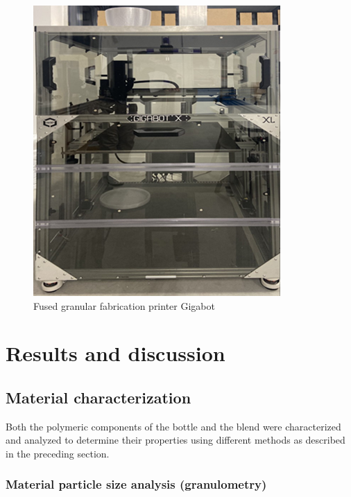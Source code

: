 \documentclass[
  letterpaper,
  DIV=11,
  numbers=noendperiod]{scrartcl}
\begin{document}
\begin{figure}

{\centering \includegraphics{figures/Figure_4_Giga.png}

}

\caption{\label{fig-gigabot}Fused granular fabrication printer Gigabot}

\end{figure}

\hypertarget{results-and-discussion}{%
\section{Results and discussion}\label{results-and-discussion}}

\hypertarget{material-characterization}{%
\subsection{Material characterization}\label{material-characterization}}

Both the polymeric components of the bottle and the blend were
characterized and analyzed to determine their properties using different
methods as described in the preceding section.

\hypertarget{material-particle-size-analysis-granulometry}{%
\subsubsection{Material particle size analysis
(granulometry)}\label{material-particle-size-analysis-granulometry}}
\end{document}
